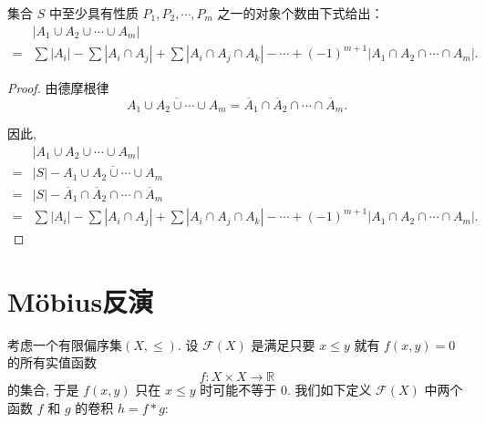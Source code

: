 \begin{theorem}[容斥原理]
    集合 $S$ 中至少具有性质 $P_1, P_2, \cdots, P_m$ 之一的对象个数由下式给出：
    \begin{align*}
         & |A_1 \cup A_2 \cup \cdots \cup A_m| \\=&\sum |A_i| - \sum |A_i \cap A_j| + \sum |A_i \cap A_j \cap A_k| - \cdots + (-1)^{m+1} |A_1 \cap A_2 \cap \cdots \cap A_m|.
    \end{align*}
\end{theorem}
\begin{proof}
    由德摩根律
    $$\overline{A_1 \cup A_2 \cup \cdots \cup A_m} = \overline{A}_1 \cap \overline{A}_2 \cap \cdots \cap \overline{A}_m.$$

    因此,
    \begin{align*}
          & |A_1 \cup A_2 \cup \cdots \cup A_m|                                                                                        \\=&|S|-\overline{A_1 \cup A_2 \cup \cdots \cup A_m}\\
        = & |S|-\overline{A}_1 \cap \overline{A}_2 \cap \cdots \cap \overline{A}_m                                                     \\
        = & \sum |A_i| - \sum |A_i \cap A_j| + \sum |A_i \cap A_j \cap A_k| - \cdots + (-1)^{m+1} |A_1 \cap A_2 \cap \cdots \cap A_m|.
    \end{align*}
\end{proof}

\section{Möbius反演}
考虑一个有限偏序集$(X,\leq)$. 设 $\mathcal{F}(X)$ 是满足只要 $x \leq y$ 就有 $f(x, y) = 0$ 的所有实值函数
\[ f : X \times X \rightarrow \mathbb{R} \]
的集合, 于是 $f(x, y)$ 只在 $x \leq y$ 时可能不等于 0. 我们如下定义 $\mathcal{F}(X)$ 中两个函数 $f$ 和 $g$ 的卷积 $h = f * g$:

